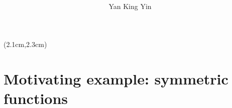 \newcommand{\logic}[1]{{\color{violet}{\textit{#1}}}}
\newcommand{\underconst}{\texttt{[image: ../2020/UnderConst.png]}}
\newcommand{\KBsymbol}{\vcenter{\hbox{\texttt{[image: ../KB-symbol.png]}}}}
\newcommand{\token}{\vcenter{\hbox{\texttt{[image: token.png]}}}}
\newcommand{\proposition}{\vcenter{\hbox{\texttt{[image: proposition.png]}}}}



\begin{preview}

\title{\vspace{-1.5cm} \bfseries{}}

\author{Yan King Yin} %

\maketitle

\setcounter{section}{-1}
\setcounter{mypage}{0}

\begin{textblock*}{5cm}(2.1cm,2.3cm) %
{\color{red}{\large \textcircled{\small \themypage}}}
\addtocounter{mypage}{1}
\end{textblock*}

\begin{minipage}{\textwidth}
\setlength{\parskip}{0.4\baselineskip}

\section{Motivating example: symmetric functions}


\end{minipage}
\end{preview}
